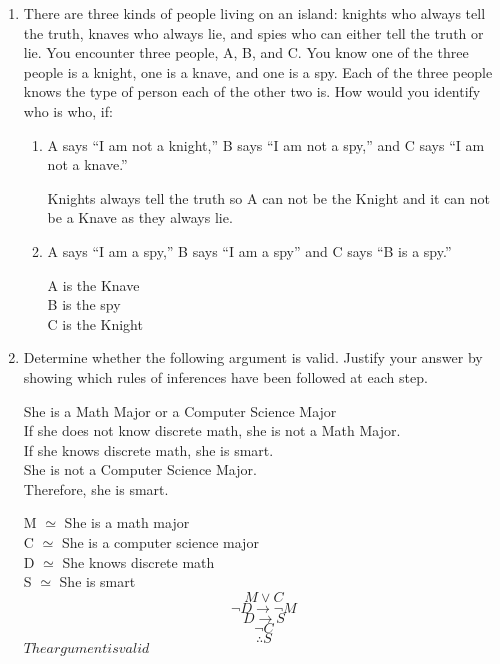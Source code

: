 \documentclass[12pt]{article}
\begin{document}
\begin{enumerate}[leftmargin=\labelsep]
\item There are three kinds of people living on an island: knights who always tell
the truth, knaves who always lie, and spies who can either tell the truth or lie. You encounter
three people, A, B, and C. You know one of the three people is a knight, one is a knave,
and one is a spy. Each of the three people knows the type of person each of the other two is.
How would you identify who is who, if:
    \begin{enumerate}
        \item A says “I am not a knight,” B says “I am not a spy,” and C says “I am not a knave.”
            \begin{tabbing}
                \> Knights always tell the truth so A can not be the Knight and it can not be a Knave as they always lie.
            \end{tabbing}
        \item A says “I am a spy,” B says “I am a spy” and C says “B is a spy.”
            \begin{tabbing}
                \> A is the Knave \\
                \> B is the spy \\
                \> C is the Knight
            \end{tabbing}
    \end{enumerate}
\item Determine whether the following argument is valid. Justify your answer by showing which rules of inferences have been followed at each step.
    \begin{tabbing}
        \> She is a Math Major or a Computer Science Major \\
        \> If she does not know discrete math, she is not a Math Major. \\
        \> If she knows discrete math, she is smart. \\
        \> She is not a Computer Science Major. \\
        \> Therefore, she is smart.
    \end{tabbing}
    
    M $\simeq$ She is a math major\\
    C $\simeq$ She is a computer science major \\
    D $\simeq$ She knows discrete math \\
    S $\simeq$ She is smart \\
    \begin{equation*}
        M \vee C
    \end{equation*}
    \begin{equation*}
       \lnot D \to \lnot M
    \end{equation*}
    \begin{equation*}
        D \to S
    \end{equation*}    
    \begin{equation*}
        \lnot C
    \end{equation*}    
    \begin{equation*}
       \therefore S
    \end{equation*}
    \therefore $ The argument is valid $


\end{enumerate}
\end{document}
